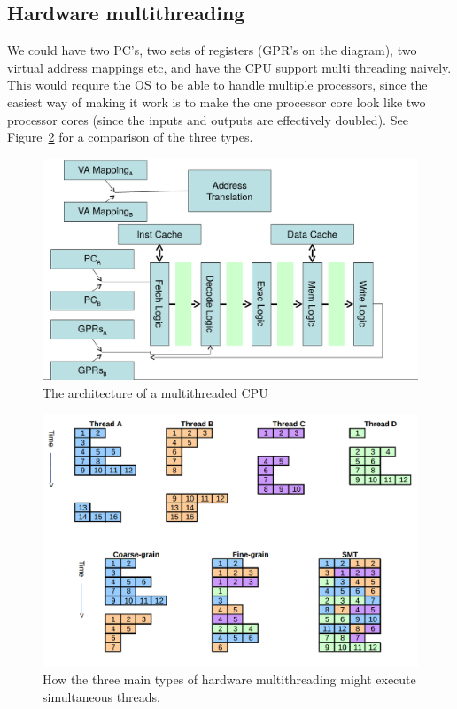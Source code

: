 \subsection{Hardware multithreading}

We could have two PC's, two sets of registers (GPR's on the diagram), two
virtual address mappings etc, and have the CPU support multi threading naively.
This would require the OS to be able to handle multiple processors, since the
easiest way of making it work is to make the one processor core look like two
processor cores (since the inputs and outputs are effectively doubled). See
Figure~\ref{hardware-multithreading-comparison} for a comparison of the three
types.

\begin{figure}[H]
  \centering
  \includegraphics[width=\textwidth]{images/hyperthreading}
  \caption{The architecture of a multithreaded CPU}
  \label{hyperthreading}
\end{figure}

\begin{figure}[H]
  \centering
  \includegraphics[width=\textwidth]{images/multithreading}
  \caption{How the three main types of hardware multithreading might execute
  simultaneous threads.}
  \label{hardware-multithreading-comparison}
\end{figure}

